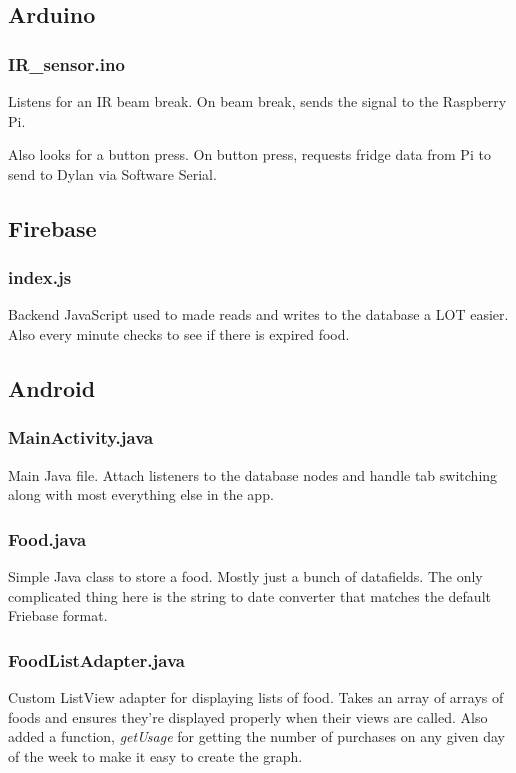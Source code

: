 \subsection{Arduino}

\subsubsection{IR\_sensor.ino}

Listens for an IR beam break. On beam break, sends the signal to the Raspberry Pi.

Also looks for a button press. On button press, requests fridge data from Pi to send to Dylan via Software Serial.

\subsection{Firebase}

\subsubsection{index.js}

Backend JavaScript used to made reads and writes to the database a LOT easier. Also every minute checks to see if there is expired food.

\subsection{Android}

\subsubsection{MainActivity.java}

Main Java file. Attach listeners to the database nodes and handle tab switching along with most everything else in the app.

\subsubsection{Food.java}

Simple Java class to store a food. Mostly just a bunch of datafields. The only complicated thing here is the string to date converter that matches the default Friebase format.

\subsubsection{FoodListAdapter.java}

Custom ListView adapter for displaying lists of food. Takes an array of arrays of foods and ensures they're displayed properly when their views are called. Also added a function, \textit{getUsage} for getting the number of purchases on any given day of the week to make it easy to create the graph.

